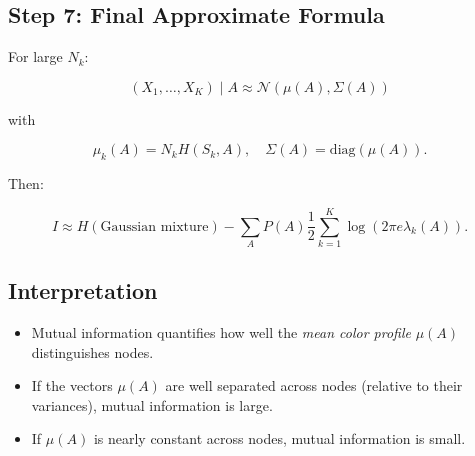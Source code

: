 \documentclass[11pt]{article}
\begin{document}
\subsection*{Step 7: Final Approximate Formula}

For large $N_k$:

\[
(X_1,\ldots,X_K) \mid A \approx \mathcal{N}(\mu(A), \Sigma(A))
\]

with

\[
\mu_k(A) = N_k H(S_k, A), \quad \Sigma(A) = \mathrm{diag}(\mu(A)).
\]

Then:

\[
I \approx H(\text{Gaussian mixture}) - \sum_A P(A) \frac{1}{2}\sum_{k=1}^K \log (2\pi e \lambda_k(A)).
\]

\subsection*{Interpretation}

\begin{itemize}
\item Mutual information quantifies how well the \emph{mean color profile} $\mu(A)$ distinguishes nodes.
\item If the vectors $\mu(A)$ are well separated across nodes (relative to their variances), mutual information is large.
\item If $\mu(A)$ is nearly constant across nodes, mutual information is small.
\end{itemize}
\end{document}
